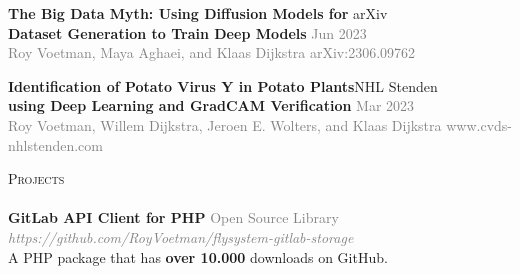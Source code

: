 \documentclass[a4paper]{article}
\newcommand{\lineunder} {
    \vspace*{-8pt} \\
    \hspace*{-18pt} \hrulefill \\
}
\newcommand{\header} [1] {
    {\hspace*{-18pt}\vspace*{6pt} \textsc{#1}}
    \vspace*{-6pt} \lineunder
}
\begin{document}
\textbf{The Big Data Myth: Using Diffusion Models for }\hfill arXiv\\
\small{\textbf{Dataset Generation to Train Deep Models} \hfill \textcolor{gray}{Jun 2023}}\\
\footnotesize{\textcolor{gray}{Roy Voetman, Maya Aghaei, and Klaas Dijkstra \hfill
 	arXiv:2306.09762}}\\
\normalsize
\vspace{2mm}

\textbf{Identification of Potato Virus Y in Potato Plants}\hfill NHL Stenden\\
\small{\textbf{using Deep Learning and GradCAM Verification} \hfill \textcolor{gray}{Mar 2023}}\\
\footnotesize{\textcolor{gray}{Roy Voetman, Willem Dijkstra, Jeroen E. Wolters, and Klaas Dijkstra} \hfill
\textcolor{gray}{www.cvds-nhlstenden.com}}\\
\normalsize
\vspace{2mm}

\vspace{5mm}

\header{Projects}

{\textbf{GitLab API Client for PHP}} \hfill \textcolor{gray}{Open Source Library}\\
\textcolor{gray}{\emph{https://github.com/RoyVoetman/flysystem-gitlab-storage}}\\
A PHP package that has \textbf{over 10.000} downloads on GitHub.

\ 
\end{document}
